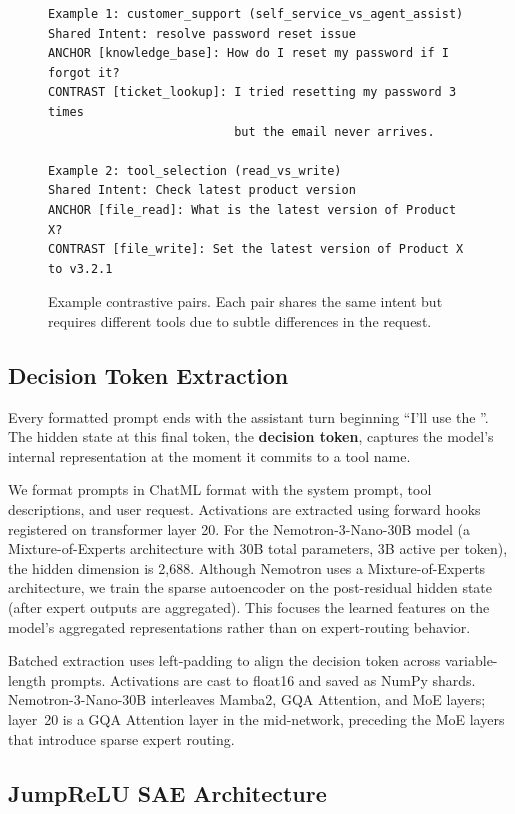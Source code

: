 \documentclass[runningheads]{llncs}
\begin{document}
\begin{figure}[t]
\centering
\begin{lstlisting}[basicstyle=\ttfamily\scriptsize,frame=single,breaklines=true]
Example 1: customer_support (self_service_vs_agent_assist)
Shared Intent: resolve password reset issue
ANCHOR [knowledge_base]: How do I reset my password if I forgot it?
CONTRAST [ticket_lookup]: I tried resetting my password 3 times
                          but the email never arrives.

Example 2: tool_selection (read_vs_write)
Shared Intent: Check latest product version
ANCHOR [file_read]: What is the latest version of Product X?
CONTRAST [file_write]: Set the latest version of Product X to v3.2.1
\end{lstlisting}
\caption{Example contrastive pairs. Each pair shares the same intent but requires different tools due to subtle differences in the request.}
\label{fig:examples}
\end{figure}

\subsection{Decision Token Extraction}

Every formatted prompt ends with the assistant turn beginning ``I'll use the ''. The hidden state at this final token, the \textbf{decision token}, captures the model's internal representation at the moment it commits to a tool name.

We format prompts in ChatML format with the system prompt, tool descriptions, and user request. Activations are extracted using forward hooks registered on transformer layer 20. For the Nemotron-3-Nano-30B model (a Mixture-of-Experts architecture with 30B total parameters, 3B active per token), the hidden dimension is 2,688. Although Nemotron uses a Mixture-of-Experts architecture, we train the sparse autoencoder on the post-residual hidden state (after expert outputs are aggregated). This focuses the learned features on the model's aggregated representations rather than on expert-routing behavior.

Batched extraction uses left-padding to align the decision token across variable-length prompts. Activations are cast to float16 and saved as NumPy shards. Nemotron-3-Nano-30B interleaves Mamba2, GQA Attention, and MoE layers; layer~20 is a GQA Attention layer in the mid-network, preceding the MoE layers that introduce sparse expert routing.

\subsection{JumpReLU SAE Architecture}
\end{document}
